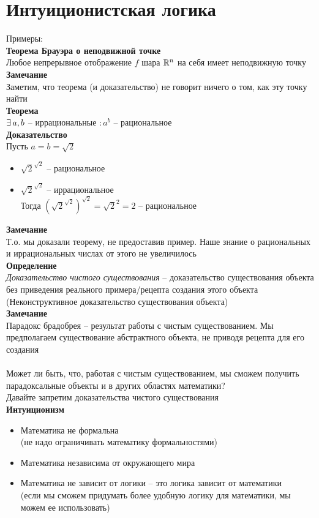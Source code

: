\documentclass[12pt]{article}
\begin{document}
\section{Интуиционистская логика}
Примеры:\\
\textbf{Теорема Брауэра о неподвижной точке}\\
Любое непрерывное отображение $f$ шара $\mathbb{R}^n$ на себя имеет неподвижную точку\\
\textbf{Замечание}\\
Заметим, что теорема (и доказательство) не говорит ничего о том, как эту точку найти\\
\textbf{Теорема}\\
$\exists\, a,b$ -- иррациональные $: a^b$ -- рациональное\\
\textbf{Доказательство}\\
Пусть $a=b=\sqrt{2}$
\begin{itemize}
    \item $\sqrt{2}^{\sqrt{2}}$ -- рациональное
    \item $\sqrt{2}^{\sqrt{2}}$ -- иррациональное\\
    Тогда $(\sqrt{2}^{\sqrt{2}})^{\sqrt{2}} = \sqrt{2}^2 = 2$ -- рациональное
\end{itemize}
\textbf{Замечание}\\
Т.о. мы доказали теорему, не предоставив пример. Наше знание о рациональных и иррациональных числах от этого не увеличилось\\
\textbf{Определение}\\
\textit{Доказательство чистого существования} -- доказательство существования объекта без приведения реального примера/рецепта создания этого объекта\\
(Неконструктивное доказательство существования объекта)\\
\textbf{Замечание}\\
Парадокс брадобрея -- результат работы с чистым существованием. Мы предполагаем существование абстрактного объекта, не приводя рецепта для его создания\\\\
Может ли быть, что, работая с чистым существованием, мы сможем получить парадоксальные объекты и в других областях математики?\\
Давайте запретим доказательства чистого существования\\
\textbf{Интуиционизм}
\begin{itemize}
    \item Математика не формальна\\
    (не надо ограничивать математику формальностями)
    \item Математика независима от окружающего мира
    \item Математика не зависит от логики -- это логика зависит от математики\\
    (если мы сможем придумать более удобную логику для математики, мы можем ее использовать)
\end{itemize}
\end{document}
